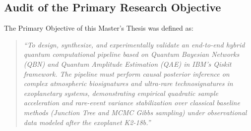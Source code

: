\subsection{Audit of the Primary Research Objective}\label{subsec:audit_primary_objective}

The Primary Objective of this Master's Thesis was defined as:
\begin{quote}
\emph{``To design, synthesize, and experimentally validate an end-to-end hybrid quantum computational pipeline based on Quantum Bayesian Networks (QBN) and Quantum Amplitude Estimation (QAE) in IBM's Qiskit framework. The pipeline must perform causal posterior inference on complex atmospheric biosignatures and ultra-rare technosignatures in exoplanetary systems, demonstrating empirical quadratic sample acceleration and rare-event variance stabilization over classical baseline methods (Junction Tree and MCMC Gibbs sampling) under observational data modeled after the exoplanet K2-18b.''}
\end{quote}

